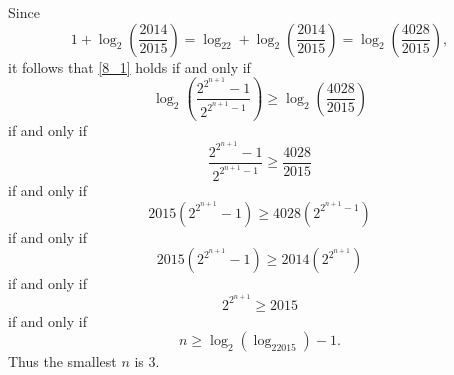 \documentclass[9pt]{article}
\begin{document}
\begin{enumerate}
      Since
      $$1 + \log_2\left(\frac{2014}{2015}\right) = 
        \log_22 + \log_2\left(\frac{2014}{2015}\right) =
              \log_2\left(\frac{4028}{2015}\right),$$
      it follows that \eqref{8_1} holds if and only if
      $$
         \log_2\left(\frac{2^{2^{n+1}} - 1}{2^{2^{n+1}-1}}\right) \ge
            \log_2\left(\frac{4028}{2015}\right)
      $$
      if and only if
      $$\frac{2^{2^{n+1}} - 1}{2^{2^{n+1}-1}} \ge \frac{4028}{2015}$$
      if and only if
      $$2015(2^{2^{n+1}}-1) \ge 4028(2^{2^{n+1}-1})$$
      if and only if
      $$2015(2^{2^{n+1}}-1) \ge 2014(2^{2^{n+1}})$$
      if and only if
      $$2^{2^{n+1}} \ge 2015$$
      if and only if
      $$n \ge \log_2(\log_22015) - 1.$$
      Thus the smallest $n$ is 3.
            
\end{enumerate}
\end{document}
